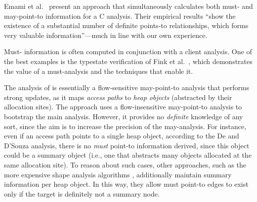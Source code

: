 Emami et al.~\cite{pldi:1994:Emami} present an approach that
simultaneously calculates both must- and may-point-to information for
a C analysis. Their empirical results ``show the existence of a
substantial number of definite points-to relationships, which forms
very valuable information''---much in line with our own
experience.

Must- information is often computed in conjunction with a
client analysis. One of the best examples is the typestate
verification of Fink et al.~\cite{issta:2006:Fink}, which demonstrates the value of
a must-analysis and the techniques that enable it.

The analysis of \cite{ecoop:2012:De} is essentially a
flow-sensitive may-point-to analysis that performs strong updates, as
it maps \emph{access paths} to \emph{heap objects} (abstracted by
their allocation sites). 
The approach uses a flow-insensitive
may-point-to analysis to bootstrap the main analysis. However, it
provides no \emph{definite} knowledge of any sort, since the aim is to
increase the precision of the may-analysis. For instance, even if an
access path points to a single heap object, according to the De and
D'Souza analysis, there is no \emph{must} point-to information
derived, since this object could be a summary object (i.e., one that
abstracts many objects allocated at the same allocation site). To
reason about such cases, other approaches, such as the more expensive
shape analysis algorithms \cite{article:2002:Sagiv},
additionally maintain summary information per heap object. In this
way, they allow must point-to edges to exist only if the target is
definitely not a summary node.


